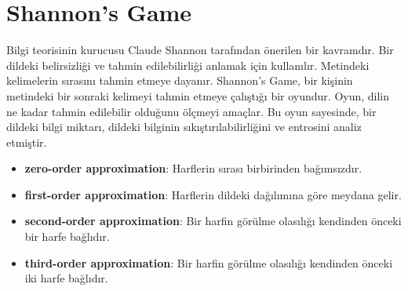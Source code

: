 \section{Shannon's Game}
Bilgi teorisinin kurucusu Claude Shannon tarafından önerilen bir kavramdır. Bir dildeki belirsizliği ve tahmin edilebilirliği anlamak için kullanılır. Metindeki kelimelerin sırasını tahmin etmeye dayanır. Shannon's Game, bir kişinin metindeki bir sonraki kelimeyi tahmin etmeye çalıştığı bir oyundur. Oyun, dilin ne kadar tahmin edilebilir olduğunu ölçmeyi amaçlar. Bu oyun sayesinde, bir dildeki bilgi miktarı, dildeki bilginin sıkıştırılabilirliğini ve entrosini analiz etmiştir.

\begin{itemize}
	\item \textbf{zero-order approximation}: Harflerin sırası birbirinden bağımsızdır.
	\item \textbf{first-order approximation}: Harflerin dildeki dağılımına göre meydana gelir.
	\item \textbf{second-order approximation}: Bir harfin görülme olasılığı kendinden önceki bir harfe bağlıdır.
	\item \textbf{third-order approximation}: Bir harfin görülme olasılığı kendinden önceki iki harfe bağlıdır.
\end{itemize}

\newpage